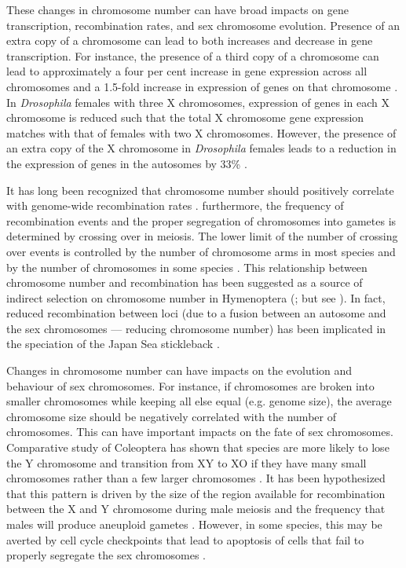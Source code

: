 These changes in chromosome number can have broad impacts on gene transcription, recombination rates, and sex chromosome evolution.
Presence of an extra copy of a chromosome can lead to both increases and decrease in gene transcription.  
For instance, the presence of a third copy of a chromosome can lead to approximately a four per cent increase in gene expression across all chromosomes and a 1.5-fold increase in expression of genes on that chromosome \citep{lockstone2007, williams2008aneuploidy}.
In \textit{Drosophila} females with three X chromosomes, expression of genes in each X chromosome is reduced such that the total X chromosome gene expression matches with that of females with two X chromosomes.%
However, the presence of an extra copy of the X chromosome in \textit{Drosophila} females leads to a reduction in the expression of genes in the autosomes by 33\% \citep{sun2013dosage}. 

It has long been recognized that chromosome number should positively correlate with genome-wide recombination rates \citep{stebbins1958}.
furthermore, the frequency of recombination events and the proper segregation of chromosomes into gametes is determined by crossing over in meiosis.
The lower limit of the number of crossing over events is controlled by the number of chromosome arms in most species and by the number of chromosomes in some species \citep{dumont2017req}.
This relationship between chromosome number and recombination has been suggested as a source of indirect selection on chromosome number in Hymenoptera (\citealt{sherman1979}; but see \citealt{ross2015}).
In fact, reduced recombination between loci (due to a fusion between an autosome and the sex chromosomes --- reducing chromosome number) has been implicated in the speciation of the Japan Sea stickleback \citep{kitano2012}. 

Changes in chromosome number can have impacts on the evolution and behaviour of sex chromosomes. 
For instance, if chromosomes are broken into smaller chromosomes while keeping all else equal (e.g. genome size), the average chromosome size should be negatively correlated with the number of chromosomes.
This can have important impacts on the fate of sex chromosomes.
Comparative study of Coleoptera has shown that species are more likely to lose the Y chromosome and transition from XY to XO if they have many small chromosomes rather than a few larger chromosomes \citep{blackmon2015bioessay}.
It has been hypothesized that this pattern is driven by the size of the region available for recombination between the X and Y chromosome during male meiosis and the frequency that males will produce aneuploid gametes \citep{blackmon2014}.
However, in some species, this may be averted by cell cycle checkpoints that lead to apoptosis of cells that fail to properly segregate the sex chromosomes \citep{dumont2017par}.


